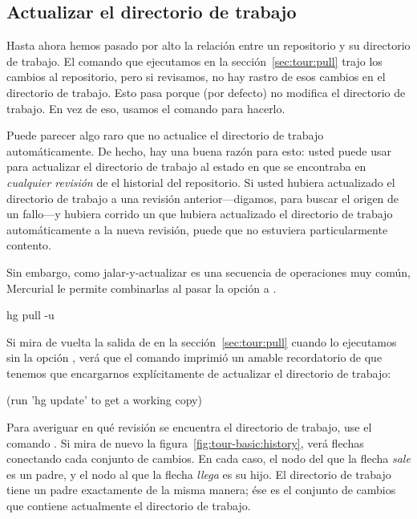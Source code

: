 \subsection{Actualizar el directorio de trabajo}

Hasta ahora hemos pasado por alto la relación entre un repositorio y
su directorio de trabajo. El comando  que ejecutamos en la
sección~\ref{sec:tour:pull} trajo los cambios al repositorio, pero si
revisamos, no hay rastro de esos cambios en el directorio de trabajo.
Esto pasa porque  (por defecto) no modifica el directorio de
trabajo. En vez de eso, usamos el comando
 para hacerlo.

Puede parecer algo raro que  no actualice el directorio de
trabajo automáticamente. De hecho, hay una buena razón para esto:
usted puede usar  para actualizar el directorio de
trabajo al estado en que se encontraba en \emph{cualquier revisión}
de el historial del repositorio. Si usted hubiera actualizado el
directorio de trabajo a una revisión anterior---digamos, para buscar
el origen de un fallo---y hubiera corrido un  que hubiera
actualizado el directorio de trabajo automáticamente a la nueva
revisión, puede que no estuviera particularmente contento.

Sin embargo, como jalar-y-actualizar es una secuencia de operaciones
muy común, Mercurial le permite combinarlas al pasar la opción
a .
\begin{codesample2}
  hg pull -u
\end{codesample2}
Si mira de vuelta la salida de  en la
sección~\ref{sec:tour:pull} cuando lo ejecutamos sin la opción ,
verá que el comando imprimió un amable recordatorio de que tenemos que
encargarnos explícitamente de actualizar el directorio de trabajo:
\begin{codesample2}
  (run 'hg update' to get a working copy)
\end{codesample2}

Para averiguar en qué revisión se encuentra el directorio de trabajo,
use el comando .
Si mira de nuevo la figura~\ref{fig:tour-basic:history}, verá flechas
conectando cada conjunto de cambios. En cada caso, el nodo del que la flecha
\emph{sale} es un padre, y el nodo al que la flecha \emph{llega} es 
su hijo. El directorio de trabajo tiene un padre exactamente de la
misma manera; ése es el conjunto de cambios que contiene actualmente
el directorio de trabajo.

